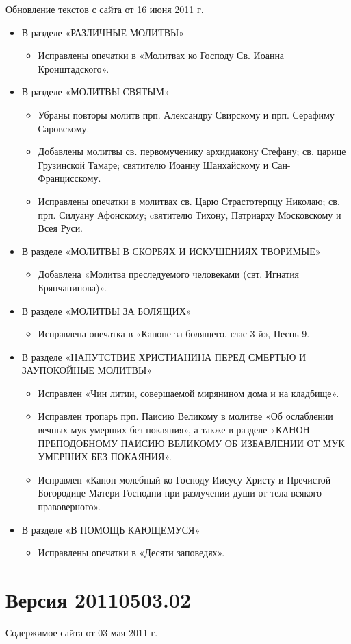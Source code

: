 Обновление текстов с сайта от 16 июня 2011 г.
\begin{itemize}

\item В разделе «РАЗЛИЧНЫЕ МОЛИТВЫ»
\begin{itemize}
\item Исправлены опечатки в «Молитвах ко Господу Св. Иоанна Кронштадского».
\end{itemize}

\item В разделе «МОЛИТВЫ СВЯТЫМ»
\begin{itemize}
\item Убраны повторы молитв прп. Александру Свирскому и прп. Серафиму Саровскому.
\item Добавлены молитвы св. первомученику архидиакону Стефану; св. царице Грузинской Тамаре; святителю Иоанну Шанхайскому и Сан-Францисскому.
\item Исправлены опечатки в молитвах св. Царю Страстотерпцу Николаю; св. прп. Силуану Афонскому; cвятителю Тихону, Патриарху Московскому и Всея Руси.
\end{itemize}

\item В разделе «МОЛИТВЫ В СКОРБЯХ И ИСКУШЕНИЯХ ТВОРИМЫЕ»
\begin{itemize}
\item Добавлена «Молитва преследуемого человеками (свт. Игнатия Брянчанинова)».
\end{itemize}

\item В разделе «МОЛИТВЫ ЗА БОЛЯЩИХ»
\begin{itemize}
\item Исправлена опечатка в «Каноне за болящего, глас 3-й», Песнь 9.
\end{itemize}

\item В разделе «НАПУТСТВИЕ ХРИСТИАНИНА ПЕРЕД СМЕРТЬЮ И ЗАУПОКОЙНЫЕ МОЛИТВЫ»
\begin{itemize}
\item Исправлен «Чин литии, совершаемой мирянином дома и на кладбище».
\item Исправлен тропарь прп. Паисию Великому в молитве «Об ослаблении вечных мук умерших без покаяния», а также в разделе «КАНОН ПРЕПОДОБНОМУ ПАИСИЮ ВЕЛИКОМУ ОБ ИЗБАВЛЕНИИ ОТ МУК УМЕРШИХ БЕЗ ПОКАЯНИЯ».
\item Исправлен «Канон молебный ко Господу Иисусу Христу и Пречистой Богородице Матери Господни при разлучении души от тела всякого правоверного».
\end{itemize}

\item В разделе «В ПОМОЩЬ КАЮЩЕМУСЯ»
\begin{itemize}
\item Исправлены опечатки в «Десяти заповедях».
\end{itemize}


\end{itemize}


\section*{Версия 20110503.02}
Содержимое сайта от 03 мая 2011 г.
\mychapterending

